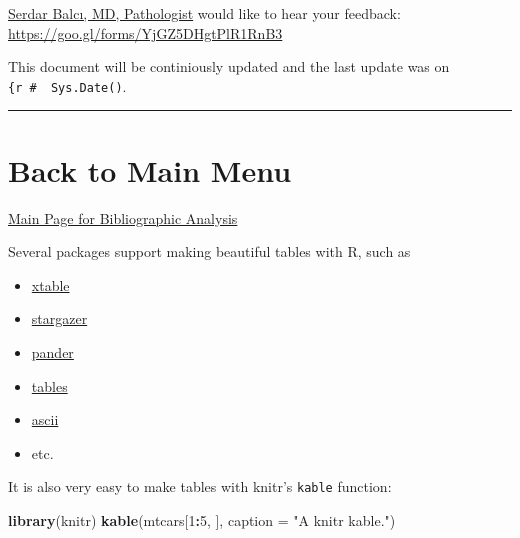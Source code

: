 \documentclass[
]{book}
\newenvironment{Shaded}{\begin{snugshade}}{\end{snugshade}}
\newcommand{\DataTypeTok}[1]{\textcolor[rgb]{0.13,0.29,0.53}{#1}}
\newcommand{\DecValTok}[1]{\textcolor[rgb]{0.00,0.00,0.81}{#1}}
\newcommand{\KeywordTok}[1]{\textcolor[rgb]{0.13,0.29,0.53}{\textbf{#1}}}
\newcommand{\NormalTok}[1]{#1}
\newcommand{\OperatorTok}[1]{\textcolor[rgb]{0.81,0.36,0.00}{\textbf{#1}}}
\newcommand{\StringTok}[1]{\textcolor[rgb]{0.31,0.60,0.02}{#1}}
\providecommand{\tightlist}{%
  \setlength{\itemsep}{0pt}\setlength{\parskip}{0pt}}
\begin{document}
\href{https://github.com/sbalci}{Serdar Balcı, MD, Pathologist} would like to hear your feedback: \url{https://goo.gl/forms/YjGZ5DHgtPlR1RnB3}

This document will be continiously updated and the last update was on \texttt{\{r\ \#\ \ Sys.Date()}.

\begin{center}\rule{0.5\linewidth}{0.5pt}\end{center}

\hypertarget{back-to-main-menu-1}{%
\chapter{Back to Main Menu}\label{back-to-main-menu-1}}

\href{https://sbalci.github.io/pubmed/BibliographicStudies.html}{Main Page for Bibliographic Analysis}

Several packages support making beautiful tables with R, such as

\begin{itemize}
\tightlist
\item
  \href{https://cran.r-project.org/web/packages/xtable/}{xtable}
\item
  \href{https://cran.r-project.org/web/packages/stargazer/}{stargazer}
\item
  \href{http://rapporter.github.io/pander/}{pander}
\item
  \href{https://cran.r-project.org/web/packages/tables/}{tables}
\item
  \href{http://eusebe.github.io/ascii/}{ascii}
\item
  etc.
\end{itemize}

It is also very easy to make tables with knitr's \texttt{kable} function:

\begin{Shaded}
\begin{Highlighting}[]
\KeywordTok{library}\NormalTok{(knitr)}
\KeywordTok{kable}\NormalTok{(mtcars[}\DecValTok{1}\OperatorTok{:}\DecValTok{5}\NormalTok{, ], }\DataTypeTok{caption =} \StringTok{"A knitr kable."}\NormalTok{)}
\end{Highlighting}
\end{Shaded}
\end{document}
